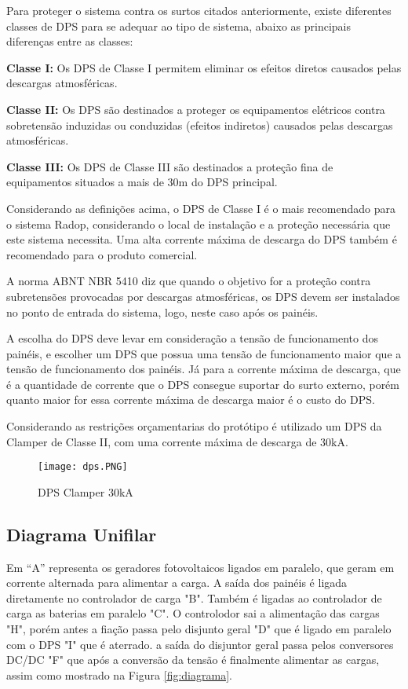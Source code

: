  Para proteger o sistema contra os surtos citados anteriormente, existe diferentes classes de DPS para se adequar ao tipo de sistema, abaixo as principais diferenças entre as classes:
 
 \textbf{Classe I:} Os DPS  de Classe I permitem eliminar os efeitos diretos causados pelas descargas atmosféricas. 
 
\textbf{Classe II:} Os DPS são destinados a proteger os equipamentos elétricos contra sobretensão induzidas ou conduzidas (efeitos indiretos) causados pelas descargas atmosféricas. 

 \textbf{Classe III:} Os DPS de Classe III são destinados a proteção fina de equipamentos situados a mais de 30m do DPS principal. 

Considerando as definições acima, o DPS de Classe I é o mais recomendado para o sistema Radop, considerando o local de instalação e a proteção necessária que este sistema necessita. Uma alta corrente máxima de descarga do DPS também é recomendado para o produto comercial. 

A norma ABNT NBR 5410 \cite{protecao} diz que quando o objetivo for a proteção contra subretensões provocadas por descargas atmosféricas, os DPS devem ser instalados no ponto de entrada do sistema, logo, neste caso após os painéis.

A escolha do DPS deve levar em consideração a tensão de funcionamento dos painéis, e escolher um DPS que possua uma tensão de funcionamento maior que a tensão de funcionamento dos painéis. Já para a corrente máxima de  descarga, que é a quantidade de corrente que o DPS consegue suportar do surto externo, porém quanto maior for essa corrente máxima de descarga maior é o custo do DPS.

Considerando as restrições orçamentarias do protótipo é utilizado um DPS da Clamper de Classe II, com uma corrente máxima de descarga de 30kA.

\begin{figure}[H]
\centering
\texttt{[image: dps.PNG]}
    \caption{DPS Clamper 30kA}
\label{fig:disjuntor}
\end{figure}
\FloatBarrier

\subsection{Diagrama Unifilar}

Em “A” representa os geradores fotovoltaicos ligados em paralelo, que geram em corrente alternada para alimentar a carga. A saída dos painéis é ligada diretamente no controlador de carga "B". Também é ligadas ao controlador de carga as baterias em paralelo "C". O controlodor sai a alimentação das cargas "H", porém antes a fiação passa pelo disjunto geral "D" que é ligado em paralelo com o DPS "I" que é aterrado. a saída do disjuntor geral passa pelos conversores DC/DC "F" que após a conversão da tensão é finalmente alimentar as cargas, assim como mostrado na Figura \ref{fig:diagrama}.

